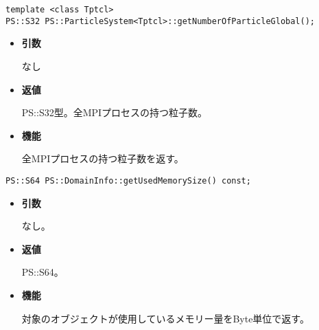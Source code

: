 
\begin{screen}
\begin{verbatim}
template <class Tptcl>
PS::S32 PS::ParticleSystem<Tptcl>::getNumberOfParticleGlobal();
\end{verbatim}
\end{screen}

\begin{itemize}

\item {\bf 引数}

なし

\item {\bf 返値}

PS::S32型。全MPIプロセスの持つ粒子数。

\item {\bf 機能}

全MPIプロセスの持つ粒子数を返す。

\end{itemize}

\begin{screen}
\begin{verbatim}
PS::S64 PS::DomainInfo::getUsedMemorySize() const;
\end{verbatim}
\end{screen}

\begin{itemize}

\item {\bf 引数}

なし。

\item {\bf 返値}

PS::S64。

\item {\bf 機能}

対象のオブジェクトが使用しているメモリー量をByte単位で返す。

\end{itemize}


\label{sec:ParticleSystem:IO}

